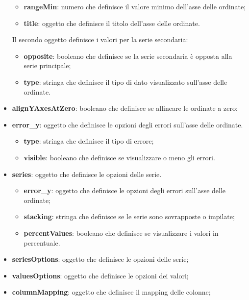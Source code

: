 \begin{itemize}
\begin{itemize}
                  \item \textbf{rangeMin}: numero che definisce il valore minimo dell'asse delle ordinate;
                  \item \textbf{title}: oggetto che definisce il titolo dell'asse delle ordinate.
            \end{itemize}
            Il secondo oggetto definisce i valori per la serie secondaria:
            \begin{itemize}
                  \item \textbf{opposite}: booleano che definisce se la serie secondaria è opposta alla serie principale;
                  \item \textbf{type}: stringa che definisce il tipo di dato visualizzato sull'asse delle ordinate.
            \end{itemize}
      \item \textbf{alignYAxesAtZero}: booleano che definisce se allineare le ordinate a zero;
      \item \textbf{error\_y}: oggetto che definisce le opzioni degli errori sull'asse delle ordinate.
            \begin{itemize}
                  \item \textbf{type}: stringa che definisce il tipo di errore;
                  \item \textbf{visible}: booleano che definisce se visualizzare o meno gli errori.
            \end{itemize}
      \item \textbf{series}: oggetto che definisce le opzioni delle serie.
            \begin{itemize}
                  \item \textbf{error\_y}: oggetto che definisce le opzioni degli errori sull'asse delle ordinate;
                  \item \textbf{stacking}: stringa che definisce se le serie sono sovrapposte o impilate;
                  \item \textbf{percentValues}: booleano che definisce se visualizzare i valori in percentuale.
            \end{itemize}
      \item \textbf{seriesOptions}: oggetto che definisce le opzioni delle serie;
      \item \textbf{valuesOptions}: oggetto che definisce le opzioni dei valori;
      \item \textbf{columnMapping}: oggetto che definisce il mapping delle colonne;

\end{itemize}
